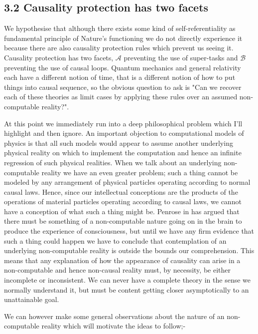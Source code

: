 \documentclass[
   ,final            %
  ]
  {aipproc}
\begin{document}
\subsection{3.2 Causality protection has two facets}
\par
We hypothesise that although there exists some kind of self-referentiality as fundamental principle of Nature's functioning we do not directly %
experience it because there are also causality protection rules which prevent us seeing it.
Causality protection has two facets, $\mathcal{A}$ preventing the use of super-tasks and $\mathcal{B}$ preventing the use of causal loops.
Quantum mechanics and general relativity each have a different notion of time, that is a different notion of how to put things into causal sequence, %
so the
obvious question to ask is "Can we recover each of these theories as limit cases by applying these rules over an
assumed non-computable reality?".  
\par
At this point we immediately run into a deep philosophical problem which
I'll highlight and then ignore. An important objection to computational models of physics is that
all such models would appear to assume another underlying physical reality on which to implement the
computation and hence an infinite regression of such physical realities. When we talk about an underlying
non-computable reality we have an even greater problem; such a thing cannot be modeled by any arrangement
of physical particles operating according to normal causal laws. Hence, since our intellectual conceptions are
the products of the operations of material particles operating according to causal laws, we cannot have a
conception of what such a thing might be. Penrose in \citet{Penrose_ENM,Penrose_SOM,penrose_hameroff} has argued that there must be something
of a non-computable nature going on in the brain to produce the experience of consciousness, but until
we have any firm evidence that such a thing could happen we have to conclude that contemplation of
an underlying non-computable reality is outside the bounds our comprehension. This means that any
explanation of how the appearance of causality can arise in a non-computable and hence non-causal reality must, by necessity, be either
incomplete or inconsistent. We can never have a complete theory in the sense we normally understand it,
but must be content getting closer asymptotically to an unattainable goal.
\par
We can however make some general observations about the nature of an non-computable reality which will motivate the ideas to follow;-
\end{document}
